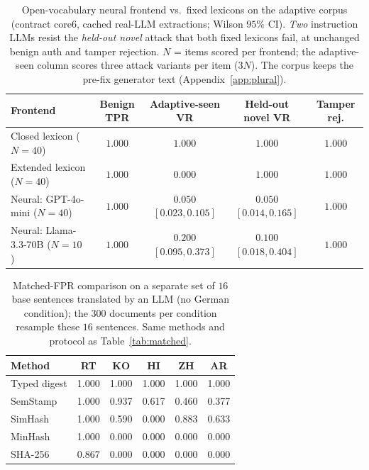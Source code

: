 \documentclass[journal]{IEEEtran}
\begin{document}
\begin{table}[t]
\centering
\caption{Open-vocabulary neural frontend vs.\ fixed lexicons on the adaptive
corpus (contract core6, cached real-LLM extractions; Wilson $95\%$ CI). \emph{Two}
instruction LLMs resist the \emph{held-out novel} attack that both fixed lexicons
fail, at unchanged benign auth and tamper rejection. $N$ = items scored per
frontend; the adaptive-seen column scores three attack variants per item ($3N$). The corpus keeps the pre-fix generator text (Appendix~\ref{app:plural}).}
\label{tab:neuraldefense}
\footnotesize
\begin{tabular}{lcccc}
\toprule
Frontend & Benign TPR & Adaptive-seen VR & Held-out novel VR & Tamper rej. \\
\midrule
Closed lexicon ($N{=}40$)         & $1.000$ & $1.000$ & $1.000$ & $1.000$ \\
Extended lexicon ($N{=}40$)       & $1.000$ & $0.000$ & $1.000$ & $1.000$ \\
Neural: GPT-4o-mini ($N{=}40$)    & $1.000$ & $0.050$ $[0.023,0.105]$ & $0.050$ $[0.014,0.165]$ & $1.000$ \\
Neural: Llama-3.3-70B ($N{=}10$)  & $1.000$ & $0.200$ $[0.095,0.373]$ & $0.100$ $[0.018,0.404]$ & $1.000$ \\
\bottomrule
\end{tabular}
\end{table}

\begin{table}[t]
\centering
\caption{Matched-FPR comparison on a separate set of $16$ base sentences
translated by an LLM (no German condition); the $300$ documents per condition
resample these $16$ sentences. Same methods and protocol as Table~\ref{tab:matched}.}
\label{tab:matched16}
\footnotesize
\begin{tabular}{@{}lccccc@{}}
\toprule
Method & RT & KO & HI & ZH & AR \\
\midrule
Typed digest   & 1.000 & 1.000 & 1.000 & 1.000 & 1.000 \\
SemStamp       & 1.000 & 0.937 & 0.617 & 0.460 & 0.377 \\
SimHash        & 1.000 & 0.590 & 0.000 & 0.883 & 0.633 \\
MinHash        & 1.000 & 0.000 & 0.000 & 0.000 & 0.000 \\
SHA-256        & 0.867 & 0.000 & 0.000 & 0.000 & 0.000 \\
\bottomrule
\end{tabular}
\end{table}
\end{document}
